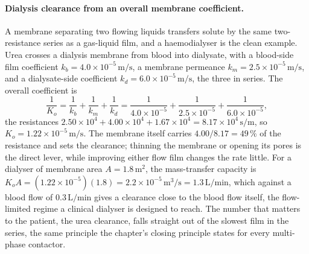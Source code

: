 \paragraph{Dialysis clearance from an overall membrane coefficient.} A
membrane separating two flowing liquids transfers solute by the same
two-resistance series as a gas-liquid film, and a haemodialyser is the
clean example. Urea crosses a dialysis membrane from blood into dialysate,
with a blood-side film coefficient $k_b = 4.0\times 10^{-5}\,\text{m/s}$,
a membrane permeance $k_m = 2.5\times 10^{-5}\,\text{m/s}$, and a
dialysate-side coefficient $k_d = 6.0\times 10^{-5}\,\text{m/s}$, the three
in series. The overall coefficient is
\[
\frac{1}{K_o} = \frac{1}{k_b} + \frac{1}{k_m} + \frac{1}{k_d} =
\frac{1}{4.0\times 10^{-5}} + \frac{1}{2.5\times 10^{-5}} +
\frac{1}{6.0\times 10^{-5}},
\]
the resistances $2.50\times 10^{4} + 4.00\times 10^{4} + 1.67\times 10^{4}
= 8.17\times 10^{4}\,\text{s/m}$, so $K_o = 1.22\times 10^{-5}\,\text{m/s}$.
The membrane itself carries $4.00/8.17 = 49\,\%$ of the resistance and
sets the clearance; thinning the membrane or opening its pores is the
direct lever, while improving either flow film changes the rate little.
For a dialyser of membrane area $A = 1.8\,\text{m}^2$, the mass-transfer
capacity is $K_o A = (1.22\times 10^{-5})(1.8) = 2.2\times 10^{-5}\,
\text{m}^3/\text{s} = 1.3\,\text{L/min}$, which against a blood flow of
$0.3\,\text{L/min}$ gives a clearance close to the blood flow itself, the
flow-limited regime a clinical dialyser is designed to reach. The number
that matters to the patient, the urea clearance, falls straight out of the
slowest film in the series, the same principle the chapter's closing
principle states for every multi-phase contactor.

